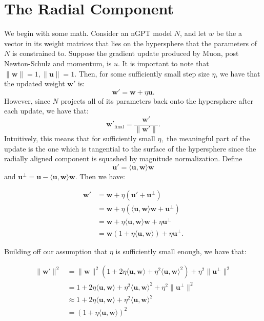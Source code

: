 \documentclass{article}
\begin{document}
\section{The Radial Component}

We begin with some math. Consider an nGPT model $N$, and let $w$ be the a vector in its weight matrices that lies on the hypersphere that the parameters of $N$ is constrained to. Suppose the gradient update produced by Muon, post Newton-Schulz and momentum, is $u$. It is important to note that $\lVert \mathbf{w} \rVert =1, \lVert \mathbf{u} \rVert = 1.$ Then, for some sufficiently small step size $\eta$, we have that the updated weight $ \mathbf{w}' $ is:
$$ \mathbf{w}'  = \mathbf{w} + \eta \mathbf{u}.$$
However, since $N$ projects all of its parameters back onto the hypersphere after each update, we have that:
$$ \mathbf{w}' _{\text{final}}=\frac{ \mathbf{w}' }{\lVert  \mathbf{w}' \rVert}.$$
Intuitively, this means that for sufficiently small $\eta,$ the meaningful part of the update is the one which is tangential to the surface of the hypersphere since the radially aligned component is squashed by magnitude normalization. Define $$\mathbf{u}'=\langle \mathbf{u},\mathbf{w} \rangle \mathbf{w}$$ and $\mathbf{u}^\perp = \mathbf{u}-\langle \mathbf{u},\mathbf{w} \rangle \mathbf{w}$. Then we have:

\begin{align*}
 \mathbf{w}'  
& = \mathbf{w} + \eta (\mathbf{u}' + \mathbf{u}^\perp) \\
& = \mathbf{w} + \eta(\langle \mathbf{u},\mathbf{w} \rangle \mathbf{w} + \mathbf{u}^\perp) \\
& = \mathbf{w} + \eta \langle \mathbf{u},\mathbf{w} \rangle \mathbf{w} + \eta \mathbf{u}^\perp \\
& = \mathbf{w} (1 +\eta \langle \mathbf{u},\mathbf{w} \rangle) + \eta \mathbf{u}^\perp.
\end{align*} 


Building off our assumption that $\eta$ is sufficiently small enough, we have that:

\begin{align*}
\lVert \mathbf{w'} \rVert ^2
& = \lVert \mathbf{w} \rVert^2(1 + 2\eta \langle \mathbf{u},\mathbf{w} \rangle + \eta^2 \langle \mathbf{u}, \mathbf{w} \rangle^2) + \eta^2 \lVert \mathbf{u}^\perp \rVert^2 \\
& = 1 + 2\eta \langle \mathbf{u},\mathbf{w} \rangle + \eta^2 \langle \mathbf{u}, \mathbf{w} \rangle^2 + \eta^2 \lVert \mathbf{u}^\perp \rVert^2 \\
& \approx 1 + 2\eta \langle \mathbf{u},\mathbf{w} \rangle + \eta^2 \langle \mathbf{u}, \mathbf{w} \rangle^2 \\
& = (1 + \eta\langle \mathbf{u}, \mathbf{w} \rangle)^2
\end{align*}
\end{document}
